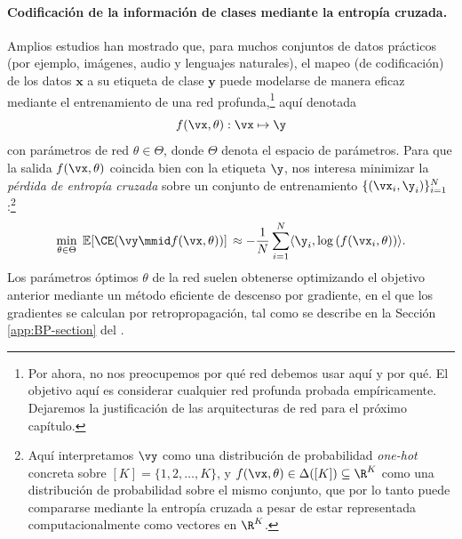 \documentclass[../../book-main.tex]{subfiles}
\begin{document}
\paragraph{Codificación de la información de clases mediante la entropía cruzada.} Amplios
estudios han mostrado que, para muchos conjuntos de datos prácticos (por ejemplo, imágenes,
audio y lenguajes naturales), el mapeo (de codificación) de los datos
$\bm{x}$ a su etiqueta de clase $\bm{y}$ puede modelarse de manera eficaz mediante
el entrenamiento de una red profunda,\footnote{Por ahora, no nos preocupemos
    por qué red debemos usar aquí y por qué. El objetivo aquí es
    considerar cualquier red profunda probada empíricamente. Dejaremos la
justificación de las arquitecturas de red para el próximo capítulo.} aquí
denotada $$f(\vx, \theta):\vx \mapsto \y$$ con parámetros de red
$\theta \in \Theta$, donde $\Theta$ denota el espacio de parámetros. Para
que la salida $f(\vx, \theta)$ coincida bien con la etiqueta $\y$, nos interesa
minimizar la {\em pérdida de entropía cruzada} sobre un conjunto de entrenamiento
$\{(\vx_i, \y_i)\}_{i=1}^N$:\footnote{Aquí interpretamos \(\vy\) como una
    distribución de probabilidad \textit{one-hot} concreta sobre \([K] =
    \{1, 2, \dots, K\}\),
    y \(f(\vx, \theta) \in \Delta([K]) \subseteq \R^{K}\) como una
    distribución de probabilidad sobre el mismo conjunto, que por lo tanto puede
    compararse mediante la entropía cruzada a pesar de estar representada computacionalmente
como vectores en \(\R^{K}\).}
\begin{equation}
    \min_{\theta \in \Theta} \; \mathbb{E}[\CE(\vy \mmid f(\vx,
    \theta))] \, \approx - \frac{1}{N}\sum_{i=1}^N \langle
    \y_i, \log\left(f(\vx_i, \theta)\right) \rangle.
    \label{chap4-eqn:cross-entropy}
\end{equation}
Los parámetros óptimos $\theta$ de la red suelen obtenerse
optimizando el objetivo anterior mediante un método eficiente de descenso por gradiente,
en el que los gradientes se calculan por retropropagación, tal como
se describe en la Sección \ref{app:BP-section} del .
\end{document}
